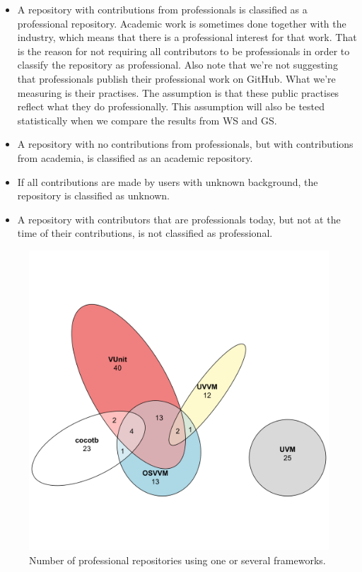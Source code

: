 \documentclass[]{article}
\providecommand{\tightlist}{%
  \setlength{\itemsep}{0pt}\setlength{\parskip}{0pt}}
\begin{document}
\begin{itemize}
\tightlist
\item
  A repository with contributions from professionals is classified as a professional repository. Academic work is sometimes done together with the industry, which means that there is a professional interest for that work. That is the reason for not requiring all contributors to be professionals in order to classify the repository as professional. Also note that we're not suggesting that professionals publish their professional work on GitHub. What we're measuring is their practises. The assumption is that these public practises reflect what they do professionally. This assumption will also be tested statistically when we compare the results from WS and GS.
\item
  A repository with no contributions from professionals, but with contributions from academia, is classified as an academic repository.
\item
  If all contributions are made by users with unknown background, the repository is classified as unknown.
\item
  A repository with contributors that are professionals today, but not at the time of their contributions, is not classified as professional.
\end{itemize}

\begin{figure}

{\centering \includegraphics[width=0.75\linewidth]{img/professional_repo_framework_distribution} 

}

\caption{Number of professional repositories using one or several frameworks.}\label{fig:professional-repo-mix}
\end{figure}
\end{document}
